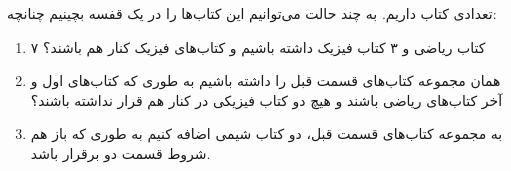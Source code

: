 تعدادی کتاب داریم. به چند حالت می‌توانیم این کتاب‌ها را در یک قفسه بچینیم چنانچه:
\begin{enumerate}
  \item 
    ۷ کتاب ریاضی و ۳ کتاب فیزیک داشته باشیم و کتاب‌های فیزیک کنار هم باشند؟

  \item
    همان مجموعه کتاب‌های قسمت قبل را داشته باشیم به طوری که کتاب‌های اول و آخر کتاب‌های ریاضی باشند و هیچ دو کتاب فیزیکی در کنار هم قرار نداشته باشند؟

  \item 
    به مجموعه‌ کتاب‌های قسمت قبل، دو کتاب شیمی اضافه کنیم به طوری که باز هم شروط قسمت دو برقرار باشد.
\end{enumerate}